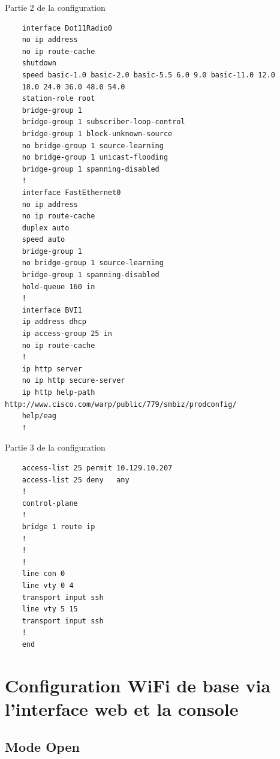 \documentclass[12pt, a4paper]{article}
\begin{document}
    \begin{listing}[H]
        \caption{Partie 2 de la configuration }
        \label{lst:conf2}
        \begin{verbatim}
    interface Dot11Radio0
    no ip address
    no ip route-cache
    shutdown
    speed basic-1.0 basic-2.0 basic-5.5 6.0 9.0 basic-11.0 12.0 
    18.0 24.0 36.0 48.0 54.0
    station-role root
    bridge-group 1
    bridge-group 1 subscriber-loop-control
    bridge-group 1 block-unknown-source
    no bridge-group 1 source-learning
    no bridge-group 1 unicast-flooding
    bridge-group 1 spanning-disabled
    !
    interface FastEthernet0
    no ip address
    no ip route-cache
    duplex auto
    speed auto
    bridge-group 1
    no bridge-group 1 source-learning
    bridge-group 1 spanning-disabled
    hold-queue 160 in
    !
    interface BVI1
    ip address dhcp
    ip access-group 25 in
    no ip route-cache
    !
    ip http server
    no ip http secure-server
    ip http help-path http://www.cisco.com/warp/public/779/smbiz/prodconfig/
    help/eag
    !
        \end{verbatim}
    \end{listing}

    \begin{listing}[H]
        \caption{Partie 3 de la configuration }
        \label{lst:conf3}
        \begin{verbatim}
    access-list 25 permit 10.129.10.207
    access-list 25 deny   any
    !
    control-plane
    !
    bridge 1 route ip
    !
    !
    !         
    line con 0
    line vty 0 4
    transport input ssh
    line vty 5 15
    transport input ssh
    !
    end
        \end{verbatim}
    \end{listing}

\section{Configuration WiFi de base via l'interface web et la console}
    \subsection{Mode Open}
\end{document}
